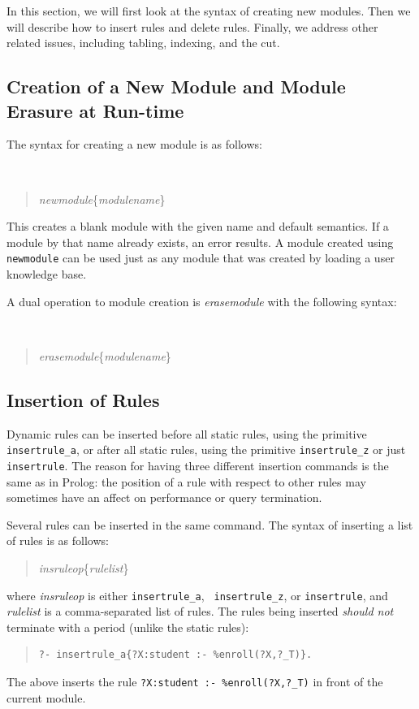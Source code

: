 \documentclass[11pt]{article}
\begin{document}
In this section, we will first look at the syntax of creating new
modules.  Then we will describe how to insert rules and delete
rules. Finally, we address other related issues, including tabling,
indexing, and the cut.


\subsection{Creation of a New Module and Module Erasure at Run-time}


The syntax for creating a new module is as follows:
{\tt
\begin{quote}
\emph{newmodule}\{\emph{modulename}\}
\end{quote}
}
\noindent
This creates a blank module with the given name and default semantics.  If
a module by that name already exists, an error results.  A module created
using {\tt newmodule} can be used just as any module that
was created by loading a user knowledge base.

A dual operation to module creation
is \emph{erasemodule} with the following syntax:
{\tt
\begin{quote}
\emph{erasemodule}\{\emph{modulename}\}
\end{quote}
}


\subsection{Insertion of Rules}
\label{sec-insertingrule}

Dynamic rules can be inserted before all static rules, using the
primitive {\tt insertrule\_a}, or after all static rules, using the
primitive {\tt insertrule\_z} or just {\tt insertrule}.
The reason for having three different insertion commands is the same as in
Prolog: the position of a rule with respect to other rules
may sometimes have an affect on
performance or query termination.

Several rules
can be inserted in the same command. The syntax of inserting a list of
rules is as follows:
\begin{quote}
\emph{insruleop}\{\emph{rulelist}\}
\end{quote}
\noindent
where \emph{insruleop} is either {\tt insertrule\_a}, {\tt
  insertrule\_z}, or {\tt insertrule},  and \emph{rulelist}  is a comma-separated
  list of rules.  The rules being inserted \emph{should not} terminate
  with a period (unlike the static rules):
\begin{quote}
\begin{verbatim}
?- insertrule_a{?X:student :- %enroll(?X,?_T)}.
\end{verbatim}
\end{quote}
The above inserts the rule {\tt ?X:student :- \verb|%|enroll(?X,?\_T)} in
front of the current module.
\end{document}
